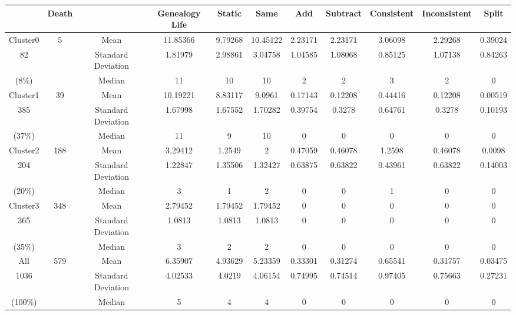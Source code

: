 {\begin{table}[htbp]
\vspace{0.5em}\centering\wuhao
\begin{tabular}{ccccccccccc}
\toprule[1.5pt]
 &Death&&Genealogy Life&	Static&	Same&	Add	&Subtract&	Consistent&	Inconsistent&	Split\\ 
\midrule[1pt]
Cluster0&\multirow{3}{*}{5}&Mean	&11.85366	&9.79268	&10.45122	&2.23171&	2.23171&	3.06098&	2.29268&	0.39024\\ \cline{3-11}
82&&Standard Deviation	&1.81979	&2.98861&	3.04758&	1.04585&	1.08068	&0.85125&1.07138&	0.84263\\ \cline{3-11}
(8\%)&&Median	&11&	10&	10&	2&	2&	3&	2	&0\\ \hline
Cluster1&\multirow{3}{*}{39}&Mean	&10.19221	&8.83117	&9.0961	&0.17143	&0.12208	&0.44416	&0.12208	&0.00519\\ \cline{3-11}
385&&Standard Deviation&	1.67998	&1.67552	&1.70282	&0.39754&	0.3278	&0.64761&	0.3278	&0.10193\\ \cline{3-11}
(37\%)&&Median	&11	&9	&10	&0&	0&	0&	0	&0\\ \hline
Cluster2&\multirow{3}{*}{188}&Mean	&3.29412	&1.2549	&2	&0.47059	&0.46078	&1.2598	&0.46078	&0.0098\\ \cline{3-11}
204&&Standard Deviation	&1.22847	&1.35506	&1.32427	&0.63875	&0.63822	&0.43961	&0.63822	&0.14003\\ \cline{3-11}
(20\%)&&Median	&3&	1&	2&	0&	0&	1&	0&	0\\ \hline
Cluster3&\multirow{3}{*}{348}&Mean	&2.79452	&1.79452	&1.79452	&0	&0	&0	&0	&0\\ \cline{3-11}
365&&Standard Deviation	&1.0813	&1.0813	&1.0813	&0	&0	&0	&0	&0\\ \cline{3-11}
(35\%)&&Median	&3	&2	&2	&0	&0	&0&	0&	0\\ \hline
All&\multirow{3}{*}{579}&Mean	&6.35907	&4.93629	&5.23359	&0.33301	&0.31274	&0.65541	&0.31757	&0.03475\\ \cline{3-11}
1036&&Standard Deviation	&4.02533	&4.0219	&4.06154	&0.74995	&0.74514	&0.97405	&0.75663	&0.27231\\ \cline{3-11}
(100\%)&&Median&	5&	4&	4&	0&	0&	0&	0&	0\\ \hline
\bottomrule[1.5pt]
\end{tabular}
\end{table}

}
